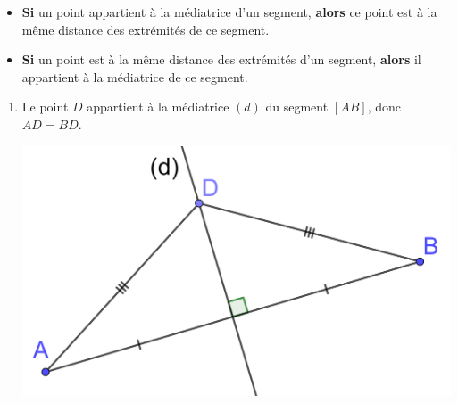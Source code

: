 \documentclass[xcolor={dvipsnames}]{beamer}
\begin{document}
\begin{frame}
	\begin{myprops}
		\begin{itemize}
				\item \textbf{Si} un point appartient à la médiatrice d'un segment, \textbf{alors} ce point est à la même distance des extrémités de ce segment. \pause
				\item \textbf{Si} un point est à la même distance des extrémités d'un segment, \textbf{alors} il appartient à la médiatrice de ce segment. \pause			
		\end{itemize}
	\end{myprops}


\begin{myexs}
		\begin{enumerate}
			\item  Le point $D$ appartient à la médiatrice $(d)$ du segment $[AB]$, donc $AD=BD$.
			\vspace*{0.5cm}
			\begin{center}
				\includegraphics[scale=0.1]{med2}
			\end{center}

			
		\end{enumerate}
	
	
\end{myexs}

\end{frame}
\end{document}
